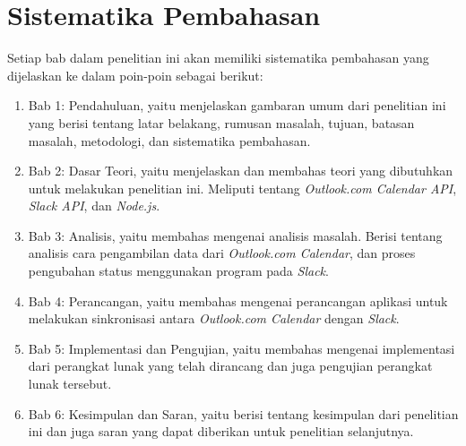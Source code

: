 \section{Sistematika Pembahasan}
\label{sec:sispem}
Setiap bab dalam penelitian ini akan memiliki sistematika pembahasan yang dijelaskan ke dalam poin-poin sebagai berikut:
\begin{enumerate}
	\item Bab 1: Pendahuluan, yaitu menjelaskan gambaran umum dari penelitian ini yang berisi tentang latar belakang, rumusan masalah, tujuan, batasan masalah, metodologi, dan sistematika pembahasan.
	\item Bab 2: Dasar Teori, yaitu menjelaskan dan membahas teori yang dibutuhkan untuk melakukan penelitian ini. Meliputi tentang \textit{Outlook.com Calendar API}, \textit{Slack API}, dan \textit{Node.js}. 
	\item Bab 3: Analisis, yaitu membahas mengenai analisis masalah. Berisi tentang analisis cara pengambilan data dari \textit{Outlook.com Calendar}, dan proses pengubahan status menggunakan program pada \textit{Slack}.
	\item Bab 4: Perancangan, yaitu membahas mengenai perancangan aplikasi untuk melakukan sinkronisasi antara \textit{Outlook.com Calendar} dengan \textit{Slack}. 
	\item Bab 5: Implementasi dan Pengujian, yaitu membahas mengenai implementasi dari perangkat lunak yang telah dirancang dan juga pengujian perangkat lunak tersebut.   
	\item Bab 6: Kesimpulan dan Saran, yaitu berisi tentang kesimpulan dari penelitian ini dan juga saran yang dapat diberikan untuk penelitian selanjutnya.  
\end{enumerate}